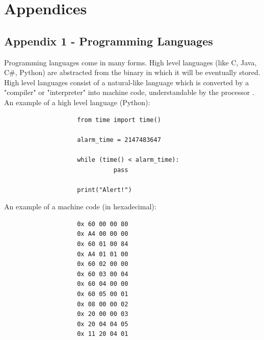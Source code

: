 \documentclass[a4]{report}
\begin{document}
\appendix


\chapter*{Appendices}
\setcounter{page}{1}
\setcounter{section}{1}
\section{Appendix 1 -  Programming Languages}
Programming languages come in many forms. High level languages (like C, Java, C\#, Python) are abstracted from the binary in which it will be eventually stored. High level languages consist of a natural-like language which is converted by a "compiler" or "interpreter" into machine code, understandable by the processor \cite{proglanghighlow}.\newline \newline  \noindent
\noindent
An example of a high level language (Python):
\begin{verbatim}
                    from time import time()

                    alarm_time = 2147483647

                    while (time() < alarm_time):
                              pass

                    print("Alert!")
\end{verbatim}
An example of a machine code (in hexadecimal)\cite{proglangmachex}:
\begin{verbatim}
                    0x 60 00 00 80
                    0x A4 00 00 00
                    0x 60 01 00 84
                    0x A4 01 01 00
                    0x 60 02 00 00
                    0x 60 03 00 04
                    0x 60 04 00 00
                    0x 60 05 00 01
                    0x 08 00 00 02
                    0x 20 00 00 03
                    0x 20 04 04 05
                    0x 11 20 04 01
\end{verbatim}
\end{document}
